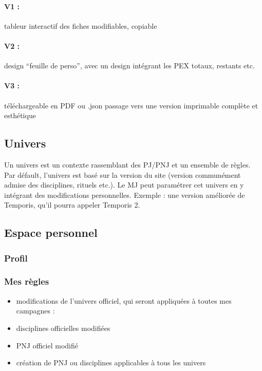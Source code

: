 \documentclass[12pt,a4paper]{article}
\begin{document}
\paragraph{V1 :} tableur interactif
des fiches modifiables, copiable

\paragraph{V2 :} design “feuille de perso”, avec un design intégrant les PEX totaux, restants etc.

\paragraph{V3 :} téléchargeable en PDF ou .json
passage vers une version imprimable complète et esthétique



\subsection{Univers}

Un univers est un contexte rassemblant des PJ/PNJ et un ensemble de règles.
Par défault, l’univers est basé sur la version du site (version communément admise des disciplines, rituels etc.).
Le MJ peut paramétrer cet univers en y intégrant des modifications personnelles. Exemple : une version améliorée de Temporis, qu’il pourra appeler Temporis 2.


\subsection{Espace personnel}

\subsubsection{Profil}

\subsubsection{Mes règles}
\begin{itemize}
  \item modifications de l’univers officiel, qui seront appliquées à toutes mes campagnes :
  \item disciplines officielles modifiées
  \item PNJ officiel modifié
  \item création de PNJ ou disciplines applicables à tous les univers
\end{itemize}
\end{document}

